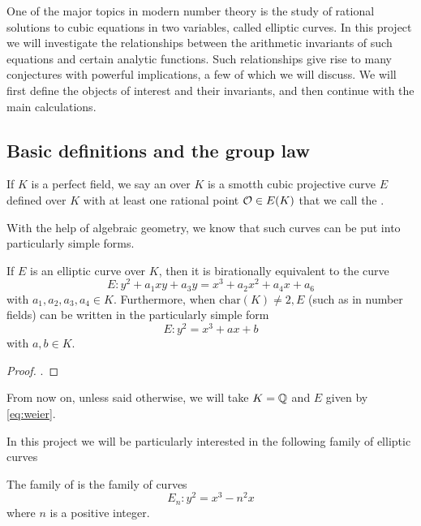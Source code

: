 \documentclass[12pt, a4paper]{amsart}
\begin{document}
One of the major topics in modern number theory is the study of rational
solutions to cubic equations in two variables, called elliptic curves.
In this project we will
investigate the relationships between the arithmetic invariants of such
equations and certain analytic functions. Such relationships give rise to
many conjectures with powerful implications, a few of which we will discuss.
We will first define the objects of interest and their invariants, and then
continue with the main calculations.

\subsection{Basic definitions and the group law}

\begin{defn}
  If $K$ is a perfect field,
  we say an  over $K$ is a smotth cubic projective
  curve $E$ defined over $K$ with at least one rational point ${\mathcal O} \in E(K)$
  that we call the .
\end{defn}
With the help of algebraic geometry, we know that such curves can be put
into particularly simple forms.

\begin{prop}
  If $E$ is an elliptic curve over $K$, then it is birationally equivalent
  to the curve
  \begin{equation} \label{eq:weier2}
    E: y^2 + a_1xy + a_3y = x^3 + a_2x^2 + a_4x + a_6
  \end{equation}
  with $a_1, a_2, a_3, a_4 \in K.$
  Furthermore, when $\text{char}(K) \neq 2, E$ (such as in number fields)
  can be written in the particularly simple form
  \begin{equation} \label{eq:weier}
    E: y^2 = x^3 + ax + b
  \end{equation}
  with $a, b \in K$.
\end{prop}

\begin{proof}
  \cite[See][Chapter III, pages 42-43]{arithmetic}.
\end{proof}

From now on, unless said otherwise, we will take $K = {\mathbb Q}$ and $E$ given
by \autoref{eq:weier}.

In this project we will be particularly interested in the following family
of elliptic curves

\begin{defn}
  The family of  is the family of curves
  \begin{equation} \label{eq:twist}
    E_n : y^2 = x^3 - n^2 x
  \end{equation}
  where $n$ is a positive integer.
\end{defn}
\end{document}
